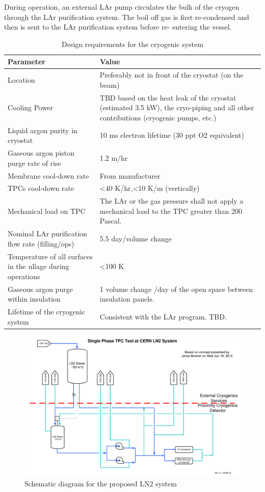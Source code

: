 During operation, an external LAr pump circulates the bulk of the cryogen through the LAr purification 
system. The boil off gas is first re-condensed and then is sent to the LAr purification system before re-
entering the vessel.


\begin{table}[htpb]
\caption{Design requirements for the cryogenic system}
\label{tbl:cryo-design-parameters}
\centering
\begin{tabular}{|p{}|p{}|}
\hline
 \textbf{ Parameter} & \textbf{Value} \\ \hline
 Location & Preferably not in front of the cryostat (on the beam) \\ \hline
 Cooling Power & TBD based on the heat leak of the cryostat (estimated 3.5 kW), the cryo-piping and all other contributions (cryogenic pumps, etc.) \\ \hline
 Liquid argon purity in cryostat & 10 ms electron lifetime (30 ppt O2 equivalent) \\  \hline
 Gaseous argon piston purge rate of rise & 1.2 m/hr \\ \hline
 Membrane cool-down rate & From manufacturer \\  \hline
 TPCs cool-down rate & \textless40 K/hr,\textless10 K/m (vertically)
 \\ \hline
Mechanical load on TPC & The LAr or the gas pressure shall not apply a mechanical load to the TPC greater than 200 Pascal. \\ \hline
Nominal LAr purification flow rate (filling/ops) & 5.5 day/volume change \\ \hline
 Temperature of all surfaces in the ullage during operations & \textless100 K \\  \hline
 Gaseous argon purge within insulation & 1 volume change /day of the open space between insulation panels. \\ \hline
 Lifetime of the cryogenic system & Consistent with the LAr program. TBD. \\ \hline
\end{tabular}
\end{table}

\begin{figure}
\begin{center}
\includegraphics[width=.75\textwidth]{figures/proposed-LN2-system} %
\caption[Schematic diagram for the proposed LN2 system]{\label{fig:proposed-LN2-system}Schematic diagram for the proposed LN2 system}
\end{center}
\end{figure}

